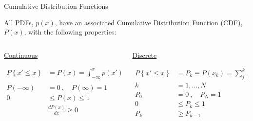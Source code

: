 \documentclass[xcolor=x11names,compress, handouts]{beamer}
\renewcommand{\(}{\begin{columns}}
\renewcommand{\)}{\end{columns}}
\newcommand{\<}[1]{\begin{column}{#1}}
\renewcommand{\>}{\end{column}}
\begin{document}
\begin{frame}{Cumulative Distribution Functions}

All PDFs, $p(x)$, have an associated \underline{Cumulative Distribution Function (CDF)}, $P(x)$, with the following properties:

\begin{columns}
  \begin{column}{0.5\textwidth}
    \begin{center}
    \textcolor{berkeleygold}{\underline{Continuous}} 
    \end{center}
    \begin{align*}
    P\left\lbrace x' \leq x \right\rbrace &= P(x) = \int_{-\infty}^x p(x')dx'\\
    & \\
    P(-\infty) &= 0 \:,\quad P(\infty) = 1 \\
    0 &\leq P(x) \leq 1 \\
    &\frac{dP(x)}{dx} \geq 0
    \end{align*}
  \end{column}
  \begin{column}{0.5\textwidth}
    \begin{center}
    \textcolor{berkeleyblue}{\underline{Discrete}}  
    \end{center}
    \begin{align*}
    P\left\lbrace x' \leq x \right\rbrace &= P_k \equiv P(x_k) = \sum_{j=1}^k p_j\\
    k &= 1, \dots, N \\
    P_0 &= 0 \:,\quad P_N = 1 \\
    0 &\leq P_k \leq 1 \\
    P_k & \geq P_{k-1} \\
    \end{align*}
  \end{column}
\end{columns}

\end{frame}
\end{document}
